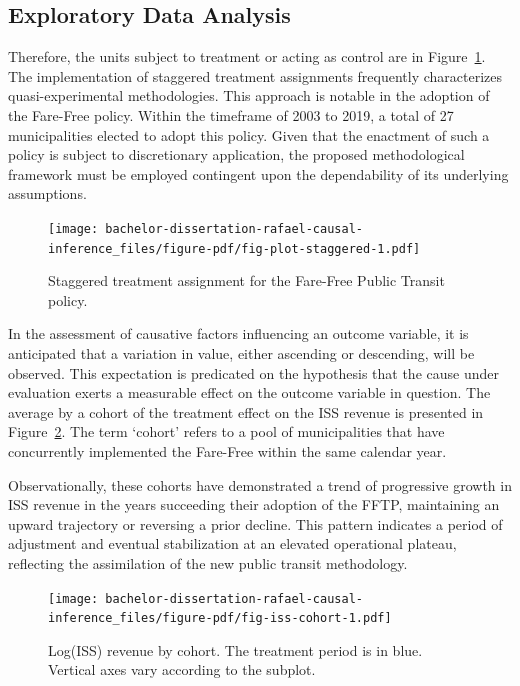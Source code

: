 \documentclass[12pt, a4paper, twoside]{article}
\numberwithin{equation}{subsection} %
\begin{document}
\hypertarget{sec-exploratory}{%
\subsection{Exploratory Data Analysis}\label{sec-exploratory}}

Therefore, the units subject to treatment or acting as control are in
Figure~\ref{fig-plot-staggered}. The implementation of staggered
treatment assignments frequently characterizes quasi-experimental
methodologies. This approach is notable in the adoption of the Fare-Free
policy. Within the timeframe of 2003 to 2019, a total of 27
municipalities elected to adopt this policy. Given that the enactment of
such a policy is subject to discretionary application, the proposed
methodological framework must be employed contingent upon the
dependability of its underlying assumptions.

\begin{figure}[H]

{\centering \texttt{[image: bachelor-dissertation-rafael-causal-inference\_files/figure-pdf/fig-plot-staggered-1.pdf]}

}

\caption{\label{fig-plot-staggered}Staggered treatment assignment for
the Fare-Free Public Transit policy.}

\end{figure}

In the assessment of causative factors influencing an outcome variable,
it is anticipated that a variation in value, either ascending or
descending, will be observed. This expectation is predicated on the
hypothesis that the cause under evaluation exerts a measurable effect on
the outcome variable in question. The average by a cohort of the
treatment effect on the ISS revenue is presented in
Figure~\ref{fig-iss-cohort}. The term `cohort' refers to a pool of
municipalities that have concurrently implemented the Fare-Free within
the same calendar year.

Observationally, these cohorts have demonstrated a trend of progressive
growth in ISS revenue in the years succeeding their adoption of the
FFTP, maintaining an upward trajectory or reversing a prior decline.
This pattern indicates a period of adjustment and eventual stabilization
at an elevated operational plateau, reflecting the assimilation of the
new public transit methodology.

\begin{figure}[H]

{\centering \texttt{[image: bachelor-dissertation-rafael-causal-inference\_files/figure-pdf/fig-iss-cohort-1.pdf]}

}

\caption{\label{fig-iss-cohort}Log(ISS) revenue by cohort. The treatment
period is in blue. Vertical axes vary according to the subplot.}

\end{figure}
\end{document}
